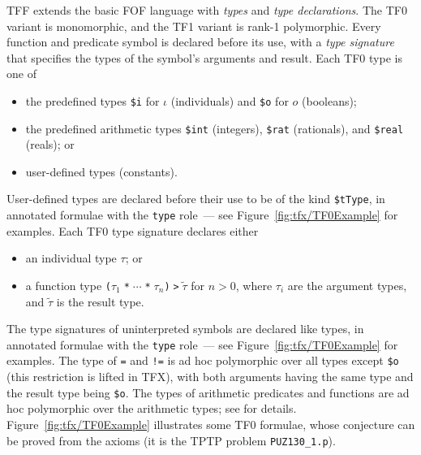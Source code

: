 TFF extends the basic FOF language with {\em types} and {\em type
declarations}.
The TF0 variant is monomorphic, and the TF1 variant is rank-1 polymorphic.
Every function and predicate symbol is declared before its use, with
a {\em type signature} that specifies the types of the symbol's arguments
and result. Each TF0 type is one of
\begin{itemize}
\item the predefined types \lstinline'$i' for $\iota$ (individuals) and
      \lstinline'$o' for $o$ (booleans);
\item the predefined arithmetic types \lstinline'$int' (integers), \lstinline'$rat'
      (rationals), and \lstinline'$real' (reals); or
\item user-defined types (constants).
\end{itemize}

User-defined types are declared before their use to be of the kind
\lstinline'$tType', in annotated formulae with the \lstinline'type' role~--- see
Figure~\ref{fig:tfx/TF0Example} for examples.
Each TF0 type signature declares either
\begin{itemize}
\item an individual type $\tau$; or
\item a function type {\tt ($\tau_1\;$*$\;{\cdots}\;$*$\;\tau_n$)$\;$>$\;\tilde \tau$}
      for $n > 0$, where $\tau_i$ are the argument types, and $\tilde \tau$
      is the result type.
\end{itemize}

The type signatures of uninterpreted symbols are declared like types, in
annotated formulae with the \lstinline'type' role~--- see Figure~\ref{fig:tfx/TF0Example}
for examples.
The type of \lstinline'=' and \lstinline'!=' is ad hoc polymorphic over all types 
except \lstinline'$o' (this restriction is lifted in TFX), with both arguments 
having the same type and the result type being \lstinline'$o'.
The types of arithmetic predicates and functions are ad hoc polymorphic
over the arithmetic types; see \cite{tff0} for details.
Figure~\ref{fig:tfx/TF0Example} illustrates some TF0 formulae, whose conjecture can
be proved from the axioms (it is the TPTP problem {\tt PUZ130\_1.p}).

